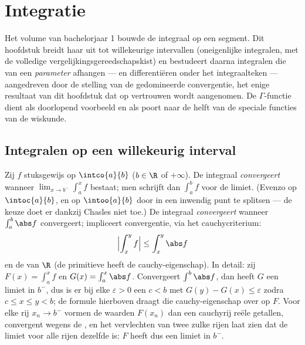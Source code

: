 \chapter{Integratie}\label{ch:b2:integration}

Het volume van bachelorjaar 1 bouwde de integraal op een segment.
Dit hoofdstuk breidt haar uit tot willekeurige intervallen
(oneigenlijke integralen, met de volledige
vergelijkingsgereedschapskist) en bestudeert daarna integralen die
van een \emph{parameter} afhangen ---  en
differentiëren onder het integraalteken --- aangedreven door de
stelling van de gedomineerde convergentie, het enige resultaat van
dit hoofdstuk dat op vertrouwen wordt aangenomen. De
$\Gamma$-functie dient als doorlopend voorbeeld en als poort naar de
helft van de speciale functies van de wiskunde.

\section{Integralen op een willekeurig interval}

\begin{definition}\label{def:b2:integration:improper}
Zij $f$ stuksgewijs  op $\intco{a}{b}$ ($b \in \R$ of
$+\infty$). De integraal
\emph{convergeert} wanneer $\lim_{x
\to b^-} \int_a^x f$ bestaat; men schrijft dan $\int_a^b f$ voor de
limiet. (Evenzo op $\intoc{a}{b}$, en op $\intoo{a}{b}$ door in een
inwendig punt te splitsen --- de keuze doet er dankzij Chasles niet
toe.) De integraal \emph{convergeert } wanneer $\int_a^b
\abs f$ convergeert;  impliceert convergentie,
via het cauchycriterium:
\[
\Bigl| \int_x^{y} f \Bigr| \leq \int_x^{y} \abs f
\]
en de  van $\R$ (de primitieve heeft de
cauchy-eigenschap). In detail: zij $F(x) = \int_a^x f$ en $G(x) =
\int_a^x \abs f$. Convergeert $\int^b\abs f$, dan heeft $G$ een
limiet in $b^-$, dus is er bij elke $\varepsilon > 0$ een $c < b$
met $G(y) - G(x) \leq \varepsilon$ zodra $c \leq x \leq y < b$; de
formule hierboven draagt die cauchy-eigenschap over op $F$. Voor
elke rij $x_n \to b^-$ vormen de waarden $F(x_n)$ dan een cauchyrij
reële getallen, convergent wegens de , en het
vervlechten van twee zulke rijen laat zien dat de limiet voor alle
rijen dezelfde is: $F$ heeft dus een limiet in $b^-$.
\end{definition}

